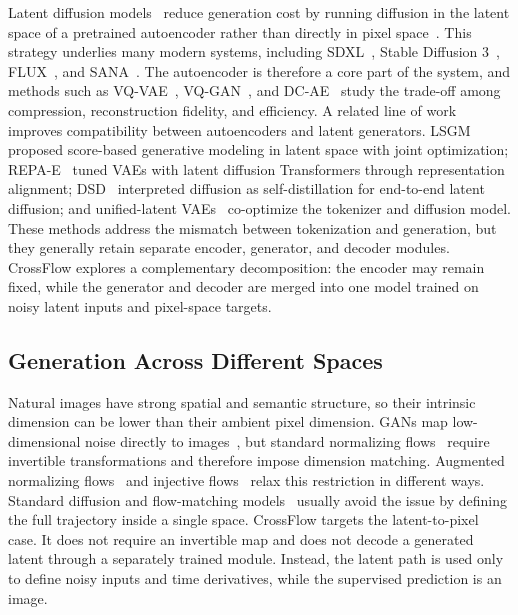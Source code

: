 Latent diffusion models~\citep{ldm} reduce generation cost by running diffusion in the latent space of a pretrained autoencoder rather than directly in pixel space~\citep{adm}. This strategy underlies many modern systems, including SDXL~\citep{sdxl}, Stable Diffusion 3~\citep{sd3}, FLUX~\citep{flux}, and SANA~\citep{sana}. The autoencoder is therefore a core part of the system, and methods such as VQ-VAE~\citep{vqvae}, VQ-GAN~\citep{vqgan}, and DC-AE~\citep{dcae} study the trade-off among compression, reconstruction fidelity, and efficiency. A related line of work improves compatibility between autoencoders and latent generators. LSGM~\citep{LSGM} proposed score-based generative modeling in latent space with joint optimization; REPA-E~\citep{REPA-E} tuned VAEs with latent diffusion Transformers through representation alignment; DSD~\citep{DSD} interpreted diffusion as self-distillation for end-to-end latent diffusion; and unified-latent VAEs~\citep{ULVAE,UNITEVAE} co-optimize the tokenizer and diffusion model. These methods address the mismatch between tokenization and generation, but they generally retain separate encoder, generator, and decoder modules. CrossFlow explores a complementary decomposition: the encoder may remain fixed, while the generator and decoder are merged into one model trained on noisy latent inputs and pixel-space targets.

\subsection{Generation Across Different Spaces}

Natural images have strong spatial and semantic structure, so their intrinsic dimension can be lower than their ambient pixel dimension. GANs map low-dimensional noise directly to images~\citep{GAN,biggan,stylegan}, but standard normalizing flows~\citep{NormalizingFlows,RealNVP} require invertible transformations and therefore impose dimension matching. Augmented normalizing flows~\citep{AugmentedNF} and injective flows~\citep{InjectiveFlows} relax this restriction in different ways. Standard diffusion and flow-matching models~\citep{DDIM,DDPM,NCSM,FlowMatching} usually avoid the issue by defining the full trajectory inside a single space. CrossFlow targets the latent-to-pixel case. It does not require an invertible map and does not decode a generated latent through a separately trained module. Instead, the latent path is used only to define noisy inputs and time derivatives, while the supervised prediction is an image. %
